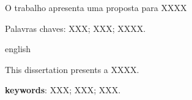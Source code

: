 \documentclass[
	12pt,				%
	openright,				%
	english,			%
	french,				%
	spanish,			%
	brazil				%
	]{abntex2}
\begin{document}




\setlength{\absparsep}{18pt} %


\begin{resumo}
    O trabalho apresenta uma proposta para XXXX
    
    Palavras chaves: XXX; XXX; XXXX.
    
\end{resumo}


% 
%


\begin{resumo}[Abstract]
\begin{otherlanguage*}{english}
	
This dissertation presents a XXXX.

 \vspace{\onelineskip}
\noindent 
  \textbf{keywords}: XXX; XXX; XXX.
\end{otherlanguage*}
\end{resumo}

\listoffigures*
\cleardoublepage

\end{document}
